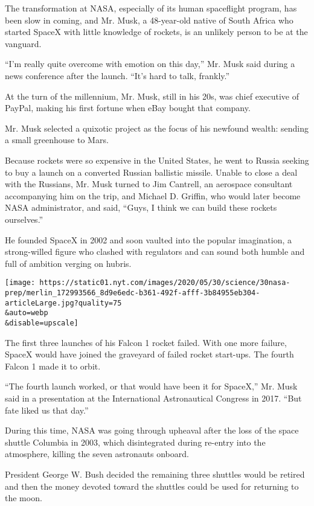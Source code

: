 The transformation at NASA, especially of its human spaceflight program,
has been slow in coming, and Mr. Musk, a 48-year-old native of South
Africa who started SpaceX with little knowledge of rockets, is an
unlikely person to be at the vanguard.

``I'm really quite overcome with emotion on this day,'' Mr. Musk said
during a news conference after the launch. ``It's hard to talk,
frankly.''

At the turn of the millennium, Mr. Musk, still in his 20s, was chief
executive of PayPal, making his first fortune when eBay bought that
company.

Mr. Musk selected a quixotic project as the focus of his newfound
wealth: sending a small greenhouse to Mars.

Because rockets were so expensive in the United States, he went to
Russia seeking to buy a launch on a converted Russian ballistic missile.
Unable to close a deal with the Russians, Mr. Musk turned to Jim
Cantrell, an aerospace consultant accompanying him on the trip, and
Michael D. Griffin, who would later become NASA administrator, and said,
``Guys, I think we can build these rockets ourselves.''

He founded SpaceX in 2002 and soon vaulted into the popular imagination,
a strong-willed figure who clashed with regulators and can sound both
humble and full of ambition verging on hubris.

\texttt{[image: https://static01.nyt.com/images/2020/05/30/science/30nasa-prep/merlin\_172993566\_8d9e6edc-b361-492f-afff-3b84955eb304-articleLarge.jpg?quality=75\\\&auto=webp\\\&disable=upscale]}

The first three launches of his Falcon 1 rocket failed. With one more
failure, SpaceX would have joined the graveyard of failed rocket
start-ups. The fourth Falcon 1 made it to orbit.

``The fourth launch worked, or that would have been it for SpaceX,'' Mr.
Musk said in a presentation at the International Astronautical Congress
in 2017. ``But fate liked us that day.''

During this time, NASA was going through upheaval after the loss of the
space shuttle Columbia in 2003, which disintegrated during re-entry into
the atmosphere, killing the seven astronauts onboard.

President George W. Bush decided the remaining three shuttles would be
retired and then the money devoted toward the shuttles could be used for
returning to the moon.

